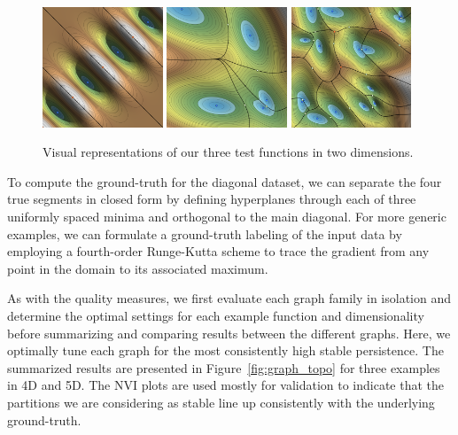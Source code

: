 \begin{figure}[!b]
    \includegraphics[width=0.32\textwidth]{figs/chap7/diag4.png}
    \includegraphics[width=0.32\textwidth]{figs/chap7/df5.png}
    \includegraphics[width=0.32\textwidth]{figs/chap7/df15.png}
    \caption[Two-dimensional test functions for topological stability analysis]{Visual representations of our three test functions in two dimensions.}
    \label{fig:datasets}
\end{figure}

To compute the ground-truth for the diagonal dataset, we can separate the four true segments in closed form by defining hyperplanes through each of three uniformly spaced minima and orthogonal to the main diagonal.
%
For more generic examples, we can formulate a ground-truth labeling of the input data by employing a fourth-order Runge-Kutta scheme to trace the gradient from any point in the domain to its associated maximum.

As with the quality measures, we first evaluate each graph family in isolation and determine the optimal settings for each example function and dimensionality before summarizing and comparing results between the different graphs.
%
Here, we optimally tune each graph for the most consistently high stable persistence.
%
The summarized results are presented in Figure~\ref{fig:graph_topo} for three examples in 4D and 5D.
%
The NVI plots are used mostly for validation to indicate that the partitions we are considering as stable line up consistently with the underlying ground-truth.

